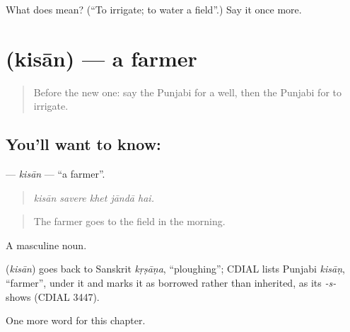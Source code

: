 \begin{tcolorbox}[breakable,colback=teal!4,colframe=teal!35!black,title={Before you move on}]
What does  mean? (\textquotedblleft{}To irrigate; to water a field\textquotedblright{}.) Say it once more.
\end{tcolorbox}
\section[\texorpdfstring{\pa{ਕਿਸਾਨ} (kisān)}{ਕਿਸਾਨ (kisān)}]{ (kisān) — a farmer}

\label{lesson:PA-C303-kisan}



\begin{quote}
Before the new one: say the Punjabi for a well, then the Punjabi for to irrigate.
\end{quote}

\subsection*{You'll want to know: }
\textbf{} — \emph{kisān} — \textquotedblleft{}a farmer\textquotedblright{}.

\begin{quote}
    
\end{quote}

\begin{quote}
\emph{kisān savere khet jāndā hai.}
\end{quote}

\begin{quote}
The farmer goes to the field in the morning.
\end{quote}

A masculine noun.

\begin{cousinweb}
\textbf{} (\emph{kisān}) goes back to Sanskrit \emph{kṛṣāṇa}, \textquotedblleft{}ploughing\textquotedblright{}; CDIAL lists Punjabi \emph{kisāṇ}, \textquotedblleft{}farmer\textquotedblright{}, under it and marks it as borrowed rather than inherited, as its \emph{-s-} shows (CDIAL 3447).
\end{cousinweb}

\begin{grammarlens}[title={What you've built}]
One more word for this chapter.
\end{grammarlens}

